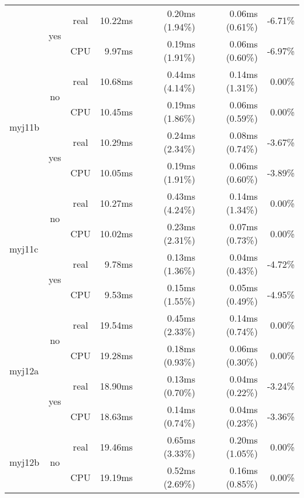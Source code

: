 \documentclass[en]{pracamgr}
\begin{document}
\begin{appendices}
\begin{small}
\begin{longtable}{|l|c|c|r|r|r|r|}
                          \cline{2-7}
                          & \multirow{2}{*}{yes} & real & 10.22ms & 0.20ms (1.94\%) & 0.06ms (0.61\%) & -6.71\% \\*
                          &                      & CPU  & 9.97ms & 0.19ms (1.91\%) & 0.06ms (0.60\%) & -6.97\% \\
\hline
\multirow{4}{*}{myj11b}   & \multirow{2}{*}{no}  & real & 10.68ms & 0.44ms (4.14\%) & 0.14ms (1.31\%) & 0.00\% \\*
                          &                      & CPU  & 10.45ms & 0.19ms (1.86\%) & 0.06ms (0.59\%) & 0.00\% \\*
                          \cline{2-7}
                          & \multirow{2}{*}{yes} & real & 10.29ms & 0.24ms (2.34\%) & 0.08ms (0.74\%) & -3.67\% \\*
                          &                      & CPU  & 10.05ms & 0.19ms (1.91\%) & 0.06ms (0.60\%) & -3.89\% \\
\hline
\multirow{4}{*}{myj11c}   & \multirow{2}{*}{no}  & real & 10.27ms & 0.43ms (4.24\%) & 0.14ms (1.34\%) & 0.00\% \\*
                          &                      & CPU  & 10.02ms & 0.23ms (2.31\%) & 0.07ms (0.73\%) & 0.00\% \\*
                          \cline{2-7}
                          & \multirow{2}{*}{yes} & real & 9.78ms & 0.13ms (1.36\%) & 0.04ms (0.43\%) & -4.72\% \\*
                          &                      & CPU  & 9.53ms & 0.15ms (1.55\%) & 0.05ms (0.49\%) & -4.95\% \\
\hline
\multirow{4}{*}{myj12a}   & \multirow{2}{*}{no}  & real & 19.54ms & 0.45ms (2.33\%) & 0.14ms (0.74\%) & 0.00\% \\*
                          &                      & CPU  & 19.28ms & 0.18ms (0.93\%) & 0.06ms (0.30\%) & 0.00\% \\*
                          \cline{2-7}
                          & \multirow{2}{*}{yes} & real & 18.90ms & 0.13ms (0.70\%) & 0.04ms (0.22\%) & -3.24\% \\*
                          &                      & CPU  & 18.63ms & 0.14ms (0.74\%) & 0.04ms (0.23\%) & -3.36\% \\
\hline
\multirow{4}{*}{myj12b}   & \multirow{2}{*}{no}  & real & 19.46ms & 0.65ms (3.33\%) & 0.20ms (1.05\%) & 0.00\% \\*
                          &                      & CPU  & 19.19ms & 0.52ms (2.69\%) & 0.16ms (0.85\%) & 0.00\% \\*

\end{longtable}
\end{small}
\end{appendices}
\end{document}
